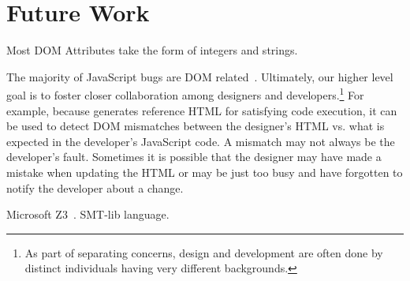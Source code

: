 \section{Future Work}  
Most DOM Attributes take the form of integers and strings.  



The majority of JavaScript bugs are DOM related~\cite{frolin2013}.
Ultimately, our higher level goal is to foster closer collaboration among designers and developers.\footnote{As part of separating concerns, design and development are often done by distinct individuals having very different backgrounds.}
For example, because \tool generates reference HTML for satisfying code execution, it can be used to detect DOM mismatches between the designer's HTML vs. what is expected in the developer's JavaScript code.  
A mismatch may not always be the developer's fault.  Sometimes it is possible that the designer may have made a mistake when updating the HTML or may be just too busy and have forgotten to notify the developer about a change.  

Microsoft Z3~\cite{z3}.  SMT-lib language.